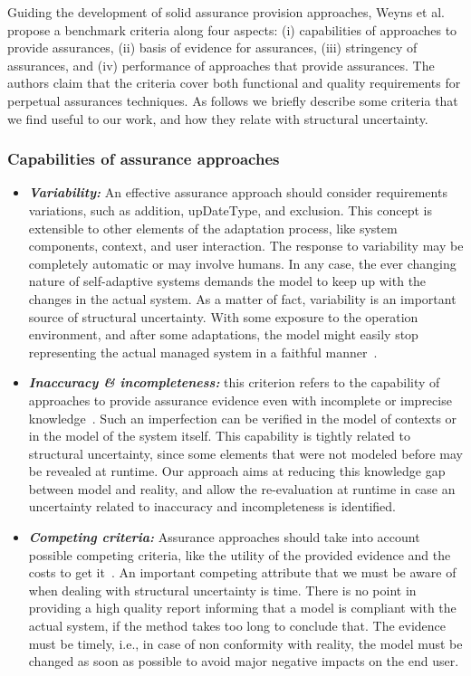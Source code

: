 Guiding the development of solid assurance provision approaches, Weyns et al.~\cite{Weyns2016PerpetualAF} propose a benchmark criteria along four aspects: (i) capabilities
of approaches to provide assurances, (ii) basis of evidence for assurances, (iii) stringency of assurances, and (iv) performance of approaches that provide assurances. The authors claim that the criteria cover both functional and quality requirements for perpetual assurances techniques. As follows we briefly describe some criteria that we find useful to our work, and how they relate with structural uncertainty.

\subsubsection{Capabilities of assurance approaches}

\begin{itemize}
\item \textit{\textbf{Variability:}} An effective assurance approach should consider requirements variations, such as addition, upDateType, and exclusion. This concept is extensible to other elements of the adaptation process, like system components, context, and user interaction. The response to variability may be completely automatic or may involve humans. In any case, the ever changing nature of self-adaptive systems demands the model to keep up with the changes in the actual system. As a matter of fact, variability is an important source of structural uncertainty. With some exposure to the operation environment, and after some adaptations, the model might easily stop representing the actual managed system in a faithful manner~\cite{Weyns2016PerpetualAF}.

\item \textit{\textbf{Inaccuracy \& incompleteness:}} this criterion refers to the capability of approaches to provide assurance evidence even with incomplete or imprecise knowledge~\cite{Weyns2016PerpetualAF}. Such an imperfection can be verified in the model of contexts or in the model of the system itself. This capability is tightly related to structural uncertainty, since some elements that were not modeled before may be revealed at runtime. Our approach aims at reducing this knowledge gap between model and reality, and allow the re-evaluation at runtime in case an uncertainty related to inaccuracy and incompleteness is identified.

\item \textit{\textbf{Competing criteria:}} Assurance approaches should take into account possible competing criteria, like the utility of the provided evidence and the costs to get it~\cite{Weyns2016PerpetualAF}. An important competing attribute that we must be aware of when dealing with structural uncertainty is time. There is no point in providing a high quality report informing that a model is compliant with the actual system, if the method takes too long to conclude that. The evidence must be timely, i.e., in case of non conformity with reality, the model must be changed as soon as possible to avoid major negative impacts on the end user.
\end{itemize}


